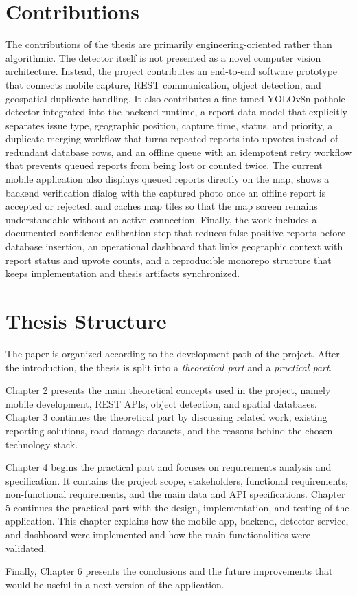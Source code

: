 \section{Contributions}

The contributions of the thesis are primarily engineering-oriented rather than algorithmic. The detector itself is not presented as a novel computer vision architecture. Instead, the project contributes an end-to-end software prototype that connects mobile capture, REST communication, object detection, and geospatial duplicate handling. It also contributes a fine-tuned YOLOv8n pothole detector integrated into the backend runtime, a report data model that explicitly separates issue type, geographic position, capture time, status, and priority, a duplicate-merging workflow that turns repeated reports into upvotes instead of redundant database rows, and an offline queue with an idempotent retry workflow that prevents queued reports from being lost or counted twice. The current mobile application also displays queued reports directly on the map, shows a backend verification dialog with the captured photo once an offline report is accepted or rejected, and caches map tiles so that the map screen remains understandable without an active connection. Finally, the work includes a documented confidence calibration step that reduces false positive reports before database insertion, an operational dashboard that links geographic context with report status and upvote counts, and a reproducible monorepo structure that keeps implementation and thesis artifacts synchronized.

\section{Thesis Structure}

The paper is organized according to the development path of the project. After the introduction, the thesis is split into a \textit{theoretical part} and a \textit{practical part}.

Chapter 2 presents the main theoretical concepts used in the project, namely mobile development, REST APIs, object detection, and spatial databases. Chapter 3 continues the theoretical part by discussing related work, existing reporting solutions, road-damage datasets, and the reasons behind the chosen technology stack.

Chapter 4 begins the practical part and focuses on requirements analysis and specification. It contains the project scope, stakeholders, functional requirements, non-functional requirements, and the main data and API specifications. Chapter 5 continues the practical part with the design, implementation, and testing of the application. This chapter explains how the mobile app, backend, detector service, and dashboard were implemented and how the main functionalities were validated.

Finally, Chapter 6 presents the conclusions and the future improvements that would be useful in a next version of the application.
